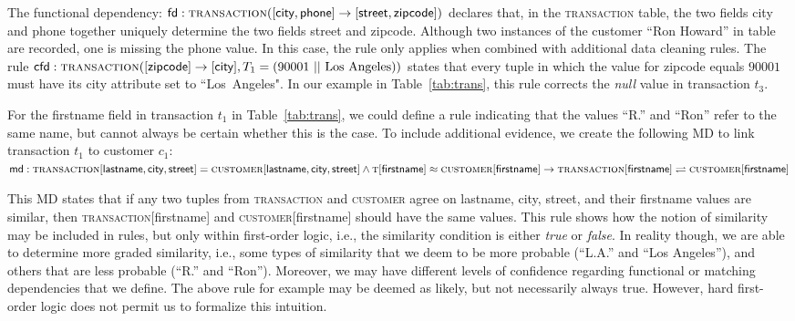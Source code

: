 The functional dependency: $\textsf{fd}: \textsc{transaction}([\textsf{city}, \textsf{phone}] \rightarrow [\textsf{street}, \textsf{zipcode}])$ declares that, in the \textsc{transaction} table, the two fields \textsf{city} and \textsf{phone} together 
uniquely determine the two fields \textsf{street} and \textsf{zipcode}. Although two instances of the customer ``Ron Howard'' in table~ are recorded, one is missing the \textsf{phone} value. In this case, the rule only applies when combined with additional data cleaning rules. The rule $\textsf{cfd}: \textsc{transaction}([\textsf{zipcode}] \rightarrow [\textsf{city}], T_1 =(90001~||~\text{Los~Angeles}))$ states that every tuple in which the value for \textsf{zipcode} equals $90001$ must have its \textsf{city} attribute set to ``Los~Angeles". In our example in Table~\ref{tab:trans}, this rule corrects the \emph{null} value in transaction $t_3$. 

For the \textsf{firstname} field in transaction $t_1$ in Table~\ref{tab:trans}, we could define a rule indicating that the values ``R.'' and ``Ron'' refer to the same name, but cannot always be certain whether this is the case. To include additional evidence, we create the following MD to link transaction $t_1$ 
to customer $c_1$:\\ 
$ \textsf{md}: \textsc{transaction}[\textsf{lastname}, \textsf{city}, \textsf{street}]
= \textsc{customer}[\textsf{lastname}, \textsf{city}, \textsf{street}] \land \textsc{t}[\textsf{firstname}] \approx \textsc{customer}[\textsf{firstname}] 
 \rightarrow \textsc{transaction}[\textsf{firstname}] \rightleftharpoons \textsc{customer}[\textsf{firstname}]$


This MD states that if any two tuples from \textsc{transaction} and \textsc{customer}
agree on \textsf{lastname}, \textsf{city}, \textsf{street}, and their \textsf{firstname} values are similar, then \textsc{transaction}[\textsf{firstname}] and \textsc{customer}[\textsf{firstname}] should have the same values. This rule shows how the notion of similarity may be included in rules, but only within first-order logic, i.e., the similarity condition is either \emph{true} or \emph{false}. In reality though, we are able to determine more graded similarity, i.e., some types of similarity that we deem to be more probable (``L.A.'' and ``Los Angeles''), and others that are less probable (``R.'' and ``Ron''). Moreover, we may have different levels of confidence regarding functional or matching dependencies that we define. The above rule for example may be deemed as likely, but not necessarily always true. However, hard first-order logic does not permit us to formalize this intuition.

